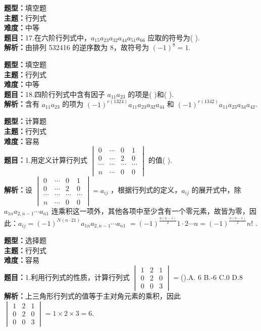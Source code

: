 \documentclass{ctexart}
\newenvironment{question}[5]{%
	\noindent\textbf{题型：}#1\\
	\textbf{主题：}#2\\
	\textbf{难度：}#3\\
	\textbf{题目：}#4\\
	\textbf{解析：}#5\\
	\vspace{1em}
}{}
\begin{document}
	\begin{question}
		{填空题}
		{行列式}
		{中等}
		{17.在六阶行列式中，$a_{15} a_{23} a_{32} a_{44} a_{51} a_{66}$ 应取的符号为(  ).}
		{由排列 532416 的逆序数为 8，故符号为 $(-1)^8 = 1$.}
	\end{question}
	
	\begin{question}
		{填空题}
		{行列式}
		{中等}
		{18.四阶行列式中含有因子 $a_{11} a_{23}$ 的项是(  )和(  ).}
		{含有 $a_{11} a_{23}$ 的项为 $(-1)^{r(1324)} a_{11} a_{23} a_{32} a_{44}$ 和 $(-1)^{r(1342)} a_{11} a_{23} a_{34} a_{42}$.}
	\end{question}
	
	
	\begin{question}
		{计算题}
		{行列式}
		{容易}
		{1.用定义计算行列式 $\begin{vmatrix}0 & \cdots & 0 & 1 \\ 0 & \cdots & 2 & 0 \\ \cdots & \cdots & \cdots & \cdots \\ n & \cdots & 0 & 0\end{vmatrix}$ 的值(  ).}
		{设 $\begin{vmatrix}0 & \cdots & 0 & 1 \\ 0 & \cdots & 2 & 0 \\ \cdots & \cdots & \cdots & \cdots \\ n & \cdots & 0 & 0\end{vmatrix}=a_{i j}$ ，根据行列式的定义，$a_{i j}$
			的展开式中，除 $a_{1 n} a_{2, n-1} \cdots a_{n 1}$ 连乘积这一项外，其他各项中至少含有一个零元素，故皆为零，因此：$a_{i j}=(-1)^{N(n \cdot 21)} a_{1 n} a_{2, n-1} \cdots a_{n 1}$ $=(-1)^{\frac{n(n-1)}{2}} 1 \cdot 2 \cdots n=(-1)^{\frac{n(n-1)}{2}} n!$ .}
	\end{question}
	
	\begin{question}
		{选择题}
		{行列式}
		{容易}
		{1.利用行列式的性质，计算行列式 $\begin{vmatrix}1 & 2 & 1 \\ 0 & 2 & 0 \\ 0 & 0 & 3\end{vmatrix}=$().A. 6 B.-6 C.0 D.8}
		{上三角形行列式的值等于主对角元素的乘积，因此 $\begin{vmatrix}1 & 2 & 1 \\ 0 & 2 & 0 \\ 0 & 0 & 3\end{vmatrix}=1 \times 2 \times 3=6$.}
	\end{question}	
	
\end{document}
